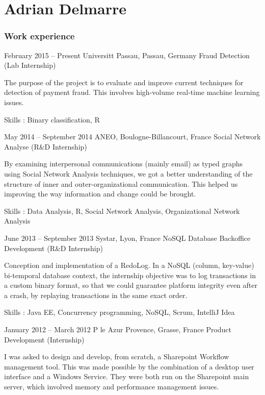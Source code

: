 \documentclass[fontsize=10pt]{tccv}
\begin{document}
\part{Adrian Delmarre}

\section{Work experience}

\begin{eventlist}

\item{February 2015 -- Present}
     {Universitt Passau, Passau, Germany}
     {Fraud Detection (Lab Internship)}

The purpose of the project is to evaluate and improve current techniques for detection of payment fraud. This involves high-volume real-time machine learning issues.

Skills : Binary classification, R

\item{May 2014 -- September 2014}
     {ANEO, Boulogne-Billancourt, France}
     {Social Network Analyse (R&D Internship)}

By examining interpersonal communications (mainly email) as typed graphs using Social Network Analysis techniques, we got a better understanding of the structure of inner and outer-organizational communication. This helped us improving the way information and change could be brought.

Skills : Data Analysis, R, Social Network Analysis, Organizational Network Analysis

\item{June 2013 -- September 2013}
     {Systar, Lyon, France}
     {NoSQL Database Backoffice Development (R\&D Internship)}

Conception and implementation of a RedoLog.
In a NoSQL (column, key-value) bi-temporal database context, the internship objective was to log transactions in a custom binary format, so that we could guarantee platform integrity even after a crash, by replaying transactions in the same exact order.

Skills : Java EE, Concurrency programming, NoSQL, Scrum, IntelliJ Idea

\item{January 2012 -- March 2012}
     {P le Azur Provence, Grasse, France}
     {Product Development (Internship)}

I was asked to design and develop, from scratch, a Sharepoint Workflow management tool. This was made possible by the combination of a desktop user interface and a Windows Service. They were both run on the Sharepoint main server, which involved memory and performance management issues.


\end{eventlist}
\end{document}
